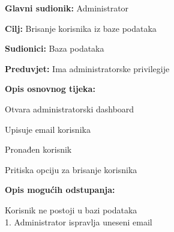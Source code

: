					\noindent {}
					\begin{packed_item}
						\item \textbf{Glavni sudionik:} Administrator
						\item \textbf{Cilj:} Brisanje korisnika iz baze podataka
						\item \textbf{Sudionici:} Baza podataka
						\item \textbf{Preduvjet:} Ima administratorske privilegije
						\item \textbf{Opis osnovnog tijeka:}
						\begin{packed_enum}
							\item Otvara administratorski dashboard
							\item Upisuje email korisnika
							\item Pronađen korisnik
							\item Pritiska opciju za brisanje korisnika
						\end{packed_enum}
						\item \textbf{Opis mogućih odstupanja:}
						\begin{packed_item}
							\item [3.a] Korisnik ne postoji u bazi podataka
							\\1. Administrator ispravlja uneseni email
						\end{packed_item}
					\end{packed_item}


